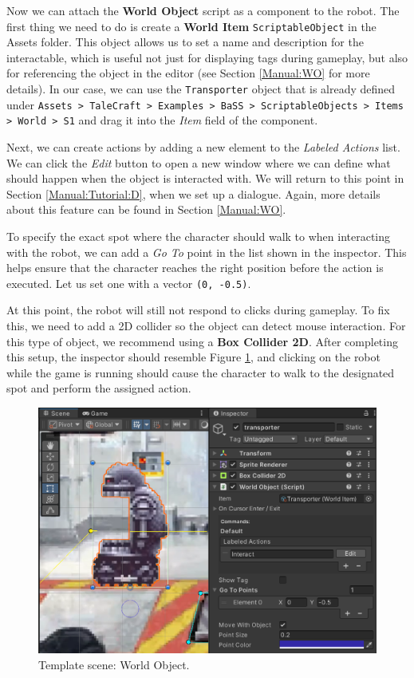 Now we can attach the \textbf{World Object} script as a component to the robot. The first thing we need to do is create a \textbf{World Item} \verb|ScriptableObject| in the Assets folder. This object allows us to set a name and description for the interactable, which is useful not just for displaying tags during gameplay, but also for referencing the object in the editor (see Section \ref{Manual:WO} for more details). In our case, we can use the \texttt{Transporter} object that is already defined under \texttt{Assets > TaleCraft > Examples > BaSS > ScriptableObjects > Items > World > S1} and drag it into the \textit{Item} field of the component.

Next, we can create actions by adding a new element to the \textit{Labeled Actions} list. We can click the \textit{Edit} button to open a new window where we can define what should happen when the object is interacted with. We will return to this point in Section \ref{Manual:Tutorial:D}, when we set up a dialogue. Again, more details about this feature can be found in Section \ref{Manual:WO}.

To specify the exact spot where the character should walk to when interacting with the robot, we can add a \textit{Go To} point in the list shown in the inspector. This helps ensure that the character reaches the right position before the action is executed. Let us set one with a vector \texttt{(0, -0.5)}.

At this point, the robot will still not respond to clicks during gameplay. To fix this, we need to add a 2D collider so the object can detect mouse interaction. For this type of object, we recommend using a \textbf{Box Collider 2D}. After completing this setup, the inspector should resemble Figure \ref{fig:Tutorial-template:WO}, and clicking on the robot while the game is running should cause the character to walk to the designated spot and perform the assigned action.

\begin{figure}[H]
\centering
\includegraphics[width=0.8\linewidth]{img/User doc/image_2025-07-08_120956206.png}
\caption{Template scene: World Object.}
\label{fig:Tutorial-template:WO}
\end{figure}

